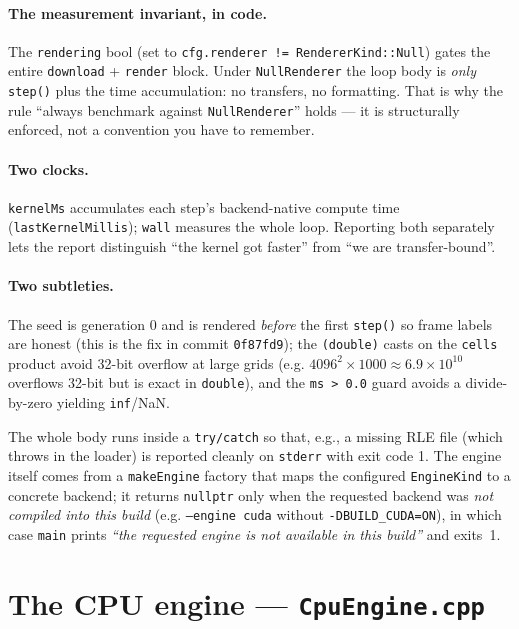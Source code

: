 \documentclass[
	english,
	letterpaper, oneside
]{article}
\begin{document}
\paragraph{The measurement invariant, in code.} The \texttt{rendering} bool
(set to \texttt{cfg.renderer != RendererKind::Null}) gates the entire
\texttt{download} + \texttt{render} block. Under \texttt{NullRenderer} the loop
body is \emph{only} \texttt{step()} plus the time accumulation: no transfers, no
formatting. That is why the rule ``always benchmark against \texttt{NullRenderer}''
holds --- it is structurally enforced, not a convention you have to remember.

\paragraph{Two clocks.} \texttt{kernelMs} accumulates each step's
backend-native compute time (\texttt{lastKernelMillis}); \texttt{wall} measures
the whole loop. Reporting both separately lets the report distinguish ``the
kernel got faster'' from ``we are transfer-bound''.

\paragraph{Two subtleties.} The seed is generation $0$ and is rendered
\emph{before} the first \texttt{step()} so frame labels are honest (this is the
fix in commit \texttt{0f87fd9}); the \texttt{(double)} casts on the
\texttt{cells} product avoid 32-bit overflow at large grids (e.g.
$4096^2\times1000\approx 6.9\times10^{10}$ overflows 32-bit but is exact in
\texttt{double}), and the \texttt{ms > 0.0} guard avoids a divide-by-zero
yielding \texttt{inf}/NaN.

The whole body runs inside a \texttt{try/catch} so that, e.g., a missing RLE file
(which throws in the loader) is reported cleanly on \texttt{stderr} with exit
code 1. The engine itself comes from a \texttt{makeEngine} factory that maps the
configured \texttt{EngineKind} to a concrete backend; it returns \texttt{nullptr}
only when the requested backend was \emph{not compiled into this build} (e.g.
\texttt{--engine cuda} without \texttt{-DBUILD\_CUDA=ON}), in which case
\texttt{main} prints \emph{``the requested engine is not available in this build''}
and exits~1.

\section{The CPU engine --- \texttt{CpuEngine.cpp}}
\label{sec:cpu}
\end{document}
